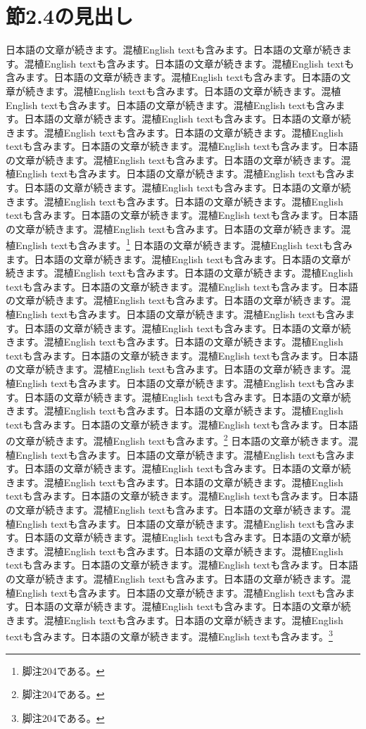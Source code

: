 \documentclass[pdflatex,book]{jlreq}
\begin{document}
\section{節2.4の見出し}
日本語の文章が続きます。混植English textも含みます。日本語の文章が続きます。混植English textも含みます。日本語の文章が続きます。混植English textも含みます。日本語の文章が続きます。混植English textも含みます。日本語の文章が続きます。混植English textも含みます。日本語の文章が続きます。混植English textも含みます。日本語の文章が続きます。混植English textも含みます。日本語の文章が続きます。混植English textも含みます。日本語の文章が続きます。混植English textも含みます。日本語の文章が続きます。混植English textも含みます。日本語の文章が続きます。混植English textも含みます。日本語の文章が続きます。混植English textも含みます。日本語の文章が続きます。混植English textも含みます。日本語の文章が続きます。混植English textも含みます。日本語の文章が続きます。混植English textも含みます。日本語の文章が続きます。混植English textも含みます。日本語の文章が続きます。混植English textも含みます。日本語の文章が続きます。混植English textも含みます。日本語の文章が続きます。混植English textも含みます。日本語の文章が続きます。混植English textも含みます。\footnote{脚注204である。}
日本語の文章が続きます。混植English textも含みます。日本語の文章が続きます。混植English textも含みます。日本語の文章が続きます。混植English textも含みます。日本語の文章が続きます。混植English textも含みます。日本語の文章が続きます。混植English textも含みます。日本語の文章が続きます。混植English textも含みます。日本語の文章が続きます。混植English textも含みます。日本語の文章が続きます。混植English textも含みます。日本語の文章が続きます。混植English textも含みます。日本語の文章が続きます。混植English textも含みます。日本語の文章が続きます。混植English textも含みます。日本語の文章が続きます。混植English textも含みます。日本語の文章が続きます。混植English textも含みます。日本語の文章が続きます。混植English textも含みます。日本語の文章が続きます。混植English textも含みます。日本語の文章が続きます。混植English textも含みます。日本語の文章が続きます。混植English textも含みます。日本語の文章が続きます。混植English textも含みます。日本語の文章が続きます。混植English textも含みます。日本語の文章が続きます。混植English textも含みます。\footnote{脚注204である。}
日本語の文章が続きます。混植English textも含みます。日本語の文章が続きます。混植English textも含みます。日本語の文章が続きます。混植English textも含みます。日本語の文章が続きます。混植English textも含みます。日本語の文章が続きます。混植English textも含みます。日本語の文章が続きます。混植English textも含みます。日本語の文章が続きます。混植English textも含みます。日本語の文章が続きます。混植English textも含みます。日本語の文章が続きます。混植English textも含みます。日本語の文章が続きます。混植English textも含みます。日本語の文章が続きます。混植English textも含みます。日本語の文章が続きます。混植English textも含みます。日本語の文章が続きます。混植English textも含みます。日本語の文章が続きます。混植English textも含みます。日本語の文章が続きます。混植English textも含みます。日本語の文章が続きます。混植English textも含みます。日本語の文章が続きます。混植English textも含みます。日本語の文章が続きます。混植English textも含みます。日本語の文章が続きます。混植English textも含みます。日本語の文章が続きます。混植English textも含みます。\footnote{脚注204である。}
\end{document}
